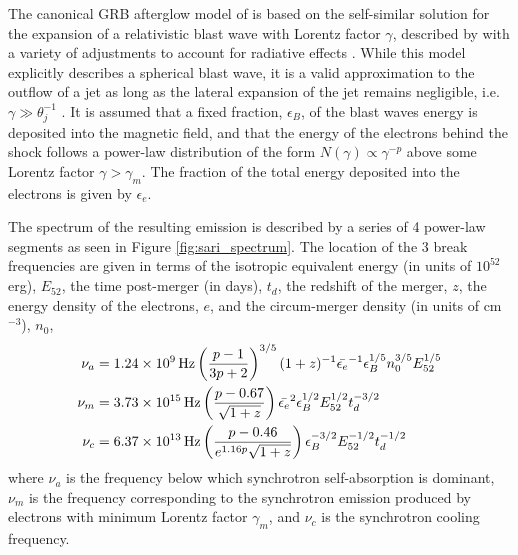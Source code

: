 The canonical GRB afterglow model of \citet{2002ApJ...568..820G} is based on the self-similar solution for the expansion of a relativistic blast wave with Lorentz factor $\gamma$, described by \citet{1976PhFl...19.1130B} with a variety of adjustments to account for radiative effects \citep{1997ApJ...489L..37S,1998ApJ...509..717C}. While this model explicitly describes a spherical blast wave, it is a valid approximation to the outflow of a jet as long as the lateral expansion of the jet remains negligible, i.e. $\gamma \gg \theta_j^{-1}$ \citep{1994AIPC..307..495P}. It is assumed that a fixed fraction, $\epsilon_B$, of the blast waves energy is deposited into the magnetic field, and that the energy of the electrons behind the shock follows a power-law distribution of the form $N(\gamma)\propto \gamma^{-p}$ above some Lorentz factor $\gamma > \gamma_m$. The fraction of the total energy deposited into the electrons is given by $\epsilon_e$.

The spectrum of the resulting emission is described by a series of 4 power-law segments as seen in Figure \ref{fig:sari_spectrum}. The location of the 3 break frequencies are given in terms of the isotropic equivalent energy (in units of $10^{52}$\,erg), $E_{52}$, the time post-merger (in days), $t_d$, the redshift of the merger, $z$, the energy density of the electrons, $e$, and the circum-merger density (in units of cm$^{-3}$), $n_0$,
\begin{align}
    \nu_a &= 1.24\times10^9 {\,\rm Hz} \left(\frac{p-1}{3p+2}\right)^{3/5}(1+z)^{-1}\bar{\epsilon_e}^{-1}\epsilon_B^{1/5} n_0^{3/5} E_{52}^{1/5}\\
    \nu_m &= 3.73\times 10^{15} {\,\rm Hz} \left(\frac{p-0.67}{\sqrt{1+z}}\right) \bar{\epsilon_e}^{2} \epsilon_B^{1/2} E_{52}^{1/2} t_d^{-3/2}\\
    \nu_c &= 6.37\times 10^{13} {\,\rm Hz} \left(\frac{p-0.46}{e^{1.16p}\sqrt{1+z}}\right) \epsilon_B^{-3/2} E_{52}^{-1/2} t_d^{-1/2}
\end{align}
where $\nu_a$ is the frequency below which synchrotron self-absorption is dominant, $\nu_m$ is the frequency corresponding to the synchrotron emission produced by electrons with minimum Lorentz factor $\gamma_m$, and $\nu_c$ is the synchrotron cooling frequency.

